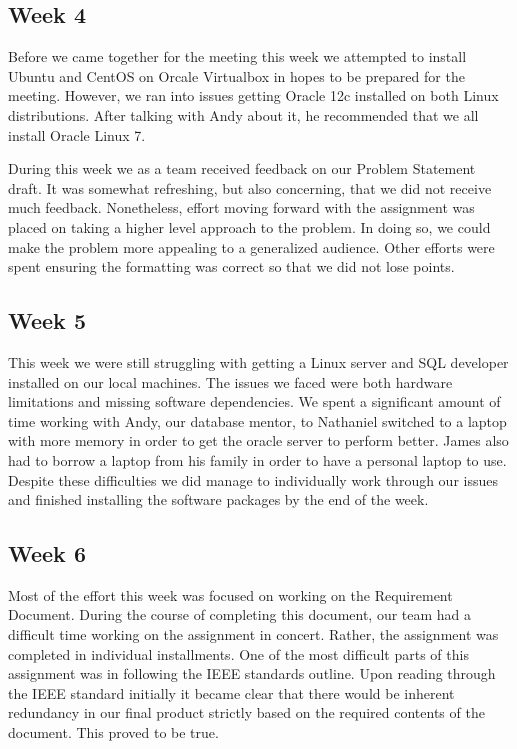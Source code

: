\documentclass[draftclsnofoot, onecolumn, compsoc, 10pt]{IEEEtran}
\begin{document}
\subsection{Week 4}
Before we came together for the meeting this week we attempted to install Ubuntu and CentOS on Orcale Virtualbox in hopes to be prepared for the meeting.
However, we ran into issues getting Oracle 12c installed on both Linux distributions.
After talking with Andy about it, he recommended that we all install Oracle Linux 7.

During this week we as a team received feedback on our Problem Statement draft.
It was somewhat refreshing, but also concerning, that we did not receive much feedback.
Nonetheless, effort moving forward with the assignment was placed on taking a higher level approach to the problem.
In doing so, we could make the problem more appealing to a generalized audience.
Other efforts were spent ensuring the formatting was correct so that we did not lose points.

\subsection{Week 5}
This week we were still struggling with getting a Linux server and SQL developer installed on our local machines.
The issues we faced were both hardware limitations and missing software dependencies.
We spent a significant amount of time working with Andy, our database mentor, to 
Nathaniel switched to a laptop with more memory in order to get the oracle server to perform better.
James also had to borrow a laptop from his family in order to have a personal laptop to use.
Despite these difficulties we did manage to individually work through our issues and finished installing the software packages by the end of the week. 


\subsection{Week 6}
Most of the effort this week was focused on working on the Requirement Document.
During the course of completing this document, our team had a difficult time working on the assignment in concert.
Rather, the assignment was completed in individual installments.
One of the most difficult parts of this assignment was in following the IEEE standards outline.
Upon reading through the IEEE standard initially it became clear that there would be inherent redundancy in our final product strictly based on the required contents of the document.
This proved to be true.
\end{document}
